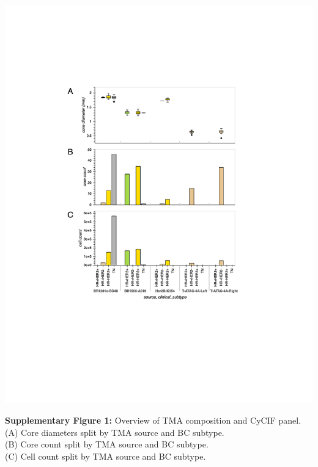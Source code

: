 \documentclass[preprint,review,3p,12pt]{elsarticle}
\begin{document}
\begin{suppfigure}[p]
\centering\includegraphics[width=\linewidth,
                 keepaspectratio]{suppfig1}
\caption{}
\label{fig:suppfig1}
\end{suppfigure}

\newpage

\noindent
\textbf{Supplementary Figure 1:} Overview of TMA composition and CyCIF panel. \\
(A) Core diameters split by TMA source and BC subtype.\\
(B) Core count split by TMA source and BC subtype.\\
(C) Cell count split by TMA source and BC subtype.
\end{document}
